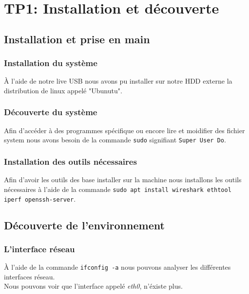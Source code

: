 \chapter{TP1: Installation et découverte}

\section{Installation et prise en main}
\subsection{Installation du système}
À l'aide de notre live USB nous avons pu installer sur notre HDD externe la distribution de linux appelé "Ubunutu".

\subsection{Découverte du système}
Afin d'accéder à des programmes spécifique ou encore lire et moidifier des fichier system nous avons besoin de la commande \texttt{sudo} signifiant \texttt{Super User Do}.

\subsection{Installation des outils nécessaires}
Afin d'avoir les outils des base installer sur la machine nous installons les outils nécessaires à l'aide de la commande \texttt{sudo apt install wireshark ethtool iperf openssh-server}.

\section{Découverte de l'environnement}
\subsection{L'interface réseau}
À l'aide de la commande \texttt{ifconfig -a} nous pouvons analyser les différentes interfaces réseau.\\
Nous pouvons voir que l'interface appelé \textit{eth0}, n'éxiste plus.

